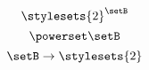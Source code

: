 \begin{forslides}
\begin{equation}
\end{equation}
\begin{equation}\label{eq:slides_session2_195}
\stylesets{2}^\setB
\end{equation}
\begin{equation}\label{eq:slides_session2_196}
\powerset \setB
\end{equation}
\begin{equation}\label{eq:slides_session2_197}
\setB \to \stylesets{2}
\end{equation}
%
%
%
%
%
%
%
%
%
%
%
%
%
%

\end{forslides}
